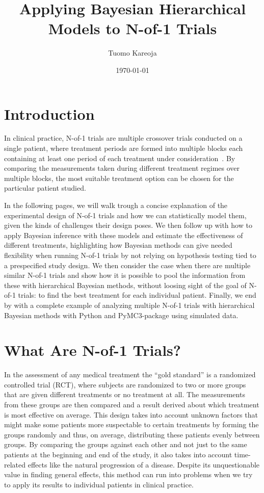 \documentclass[12pt,a4paper,leqno]{report}
\title{Applying Bayesian Hierarchical Models to N-of-1 Trials}
\author{Tuomo Kareoja}
\date{\today}
\theoremstyle{plain}
\theoremstyle{definition}
\theoremstyle{remark}
\begin{document}
\maketitle

\tableofcontents

\chapter*{Introduction}\label{intro}

In clinical practice, N-of-1 trials are multiple crossover trials conducted on a
single patient, where treatment periods are formed into multiple blocks each
containing at least one period of each treatment under
consideration\ \cite{nofone}. By comparing the measurements taken during different
treatment regimes over multiple blocks, the most suitable treatment option can
be chosen for the particular patient studied.

In the following pages, we will walk trough a concise explanation of the
experimental design of N-of-1 trials and how we can statistically model them,
given the kinds of challenges their design poses. We then follow up with how to
apply Bayesian inference with these models and estimate the effectiveness of different
treatments, highlighting how Bayesian methods can give needed flexibility when
running N-of-1 trials by not relying on hypothesis testing tied to a
prespecified study design. We then consider the case when there are multiple
similar N-of-1 trials and show how it is possible to pool the information from
these with hierarchical Bayesian methods, without loosing sight of the goal of
N-of-1 trials: to find the best treatment for each individual
patient. Finally, we end by with a complete example of analyzing multiple N-of-1
trials with hierarchical Bayesian methods with Python and PyMC3-package using
simulated data.

\chapter{What Are N-of-1 Trials?}\label{nof1}

In the assessment of any medical treatment the ``gold standard'' is a randomized
controlled trial (RCT), where subjects are randomized to two or more groups that
are given different treatments or no treatment at all. The measurements from
these groups are then compared and a result derived about which treatment is
most effective on average. This design takes into account unknown factors that
might make some patients more suspectable to certain treatments by forming the
groups randomly and thus, on average, distributing these patients evenly between
groups. By comparing the groups against each other and not just to the same
patients at the beginning and end of the study, it also takes into account time-related
effects like the natural progression of a disease. Despite its unquestionable value
in finding general effects, this method can run into problems when we
try to apply its results to individual patients in clinical practice.
\end{document}
